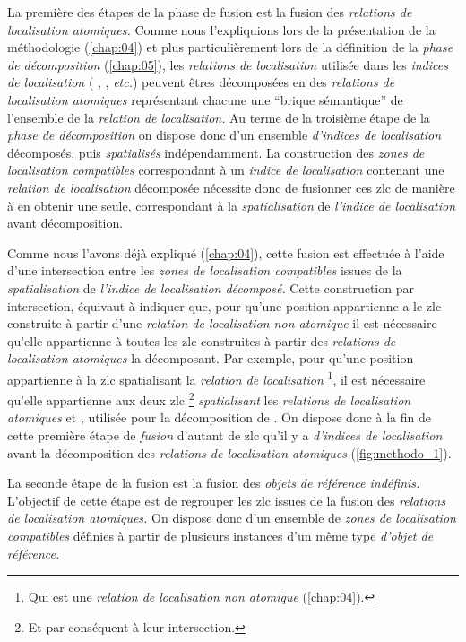 La première des étapes de la phase de fusion est la fusion des
\emph{relations de localisation atomiques.} Comme nous l'expliquions
lors de la présentation de la méthodologie (\autoref{chap:04}) et plus
particulièrement lors de la définition de la \emph{phase de
  décomposition} (\autoref{chap:05}), les \emph{relations de
  localisation} utilisée dans les \emph{indices de localisation} (\eg
{}, , \emph{etc.})
peuvent êtres décomposées en des \emph{relations de localisation
  atomiques} représentant chacune une \enquote{brique sémantique} de
l'ensemble de la \emph{relation de localisation.} Au terme de la
troisième étape de la \emph{phase de décomposition} on dispose donc
d'un ensemble \emph{d'indices de localisation} décomposés, puis
\emph{spatialisés} indépendamment. La construction des \emph{zones de
  localisation compatibles} correspondant à un \emph{indice de
  localisation} contenant une \emph{relation de localisation}
décomposée nécessite donc de fusionner ces \ac{zlc} de manière à en
obtenir une seule, correspondant à la \emph{spatialisation} de
\emph{l'indice de localisation} avant décomposition.

Comme nous l'avons déjà expliqué (\autoref{chap:04}), cette fusion est
effectuée à l'aide d'une intersection entre les \emph{zones de
  localisation compatibles} issues de la \emph{spatialisation} de
\emph{l'indice de localisation décomposé.} Cette construction par
intersection, équivaut à indiquer que, pour qu'une position
appartienne a le \ac{zlc} construite à partir d'une \emph{relation de
  localisation non atomique} il est nécessaire qu'elle appartienne à
toutes les \ac{zlc} construites à partir des \emph{relations de
  localisation atomiques} la décomposant. Par exemple, pour qu'une
position appartienne à la \ac{zlc} spatialisant la \emph{relation de
  localisation}  \footnote{Qui est une
  \emph{relation de localisation non atomique} (\autoref{chap:04}).},
il est nécessaire qu'elle appartienne aux deux \ac{zlc} \footnote{Et
  par conséquent à leur intersection.} \emph{spatialisant} les
\emph{relations de localisation atomiques} 
et , utilisée pour la décomposition de
.
%
On dispose donc à la fin de cette première étape de \emph{fusion}
d'autant de \ac{zlc} qu'il y a \emph{d'indices de localisation} avant
la décomposition des \emph{relations de localisation atomiques}
(\autoref{fig:methodo_1}).

La seconde étape de la fusion est la fusion des \emph{objets de
  référence indéfinis.} L'objectif de cette étape est de regrouper les
\ac{zlc} issues de la fusion des \emph{relations de localisation
  atomiques.} On dispose donc d'un ensemble de \emph{zones de
  localisation compatibles} définies à partir de plusieurs instances
d'un même type \emph{d'objet de référence.}


